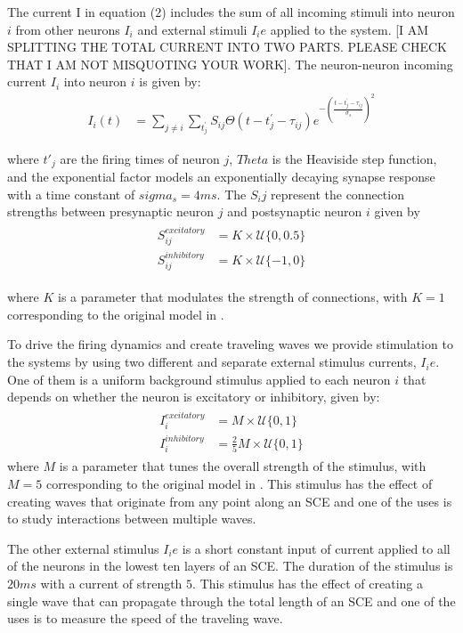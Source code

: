 \documentclass[a4paper,11pt]{article}
\begin{document}
The current I in equation (2) includes the sum of all incoming stimuli into neuron $i$ from other neurons $I_i$ and external stimuli $I_ie$ applied to the system.
[I AM SPLITTING THE TOTAL CURRENT INTO TWO PARTS. PLEASE CHECK THAT I AM NOT MISQUOTING YOUR WORK]. 
The neuron-neuron incoming current $I_i$ into neuron $i$ is given by:
\begin{align}
 I_i(t) &= \sum_{j\ne i} \sum_{t^\prime_j} S_{ij}  \Theta(t-t^\prime_j-\tau_{ij})e^{-(\frac{t-t^\prime_j-\tau_{ij}}{\sigma_s})^2}
\end{align}

where $t'_j$ are the firing times of neuron $j$, $Theta$ is the Heaviside step function, and the exponential factor models an exponentially decaying synapse response with a time constant of $sigma_s = 4 ms$. 
The $S_ij$ represent the connection strengths between presynaptic neuron $j$ and postsynaptic neuron $i$ given by
\begin{align}
 \begin{split}
  S_{ij}^{excitatory} &= K \times \mathcal{U}\{0,0.5 \} \\
  S_{ij}^{inhibitory} &= K \times \mathcal{U}\{-1,0 \} 
 \end{split}
\end{align}

where $K$ is a parameter that modulates the strength of connections, with $K=1$ corresponding to the original model in \cite{izhikevich2003}.

To drive the firing dynamics and create traveling waves we provide stimulation to the systems by using two different and separate external stimulus currents, $I_ie$. 
One of them is a uniform background stimulus applied to each neuron $i$ that depends on whether the neuron is excitatory or inhibitory, given by:
\begin{align}\label{eq:randomstim}
 \begin{split}
  I_i^{excitatory} &= M \times \mathcal{U}\{0,1 \} \\
  I_i^{inhibitory} &= \frac{2}{5} M \times \mathcal{U}\{0,1 \}
 \end{split}
\end{align}
where $M$ is a parameter that tunes the overall strength of the stimulus, with $M=5$ corresponding to the original model in \cite{izhikevich2003}. 
This stimulus has the effect of creating waves that originate from any point along an SCE and one of the uses is to study interactions between multiple waves.

The other external stimulus $I_ie$ is a short constant input of current applied to all of the neurons in the lowest ten layers of an SCE. 
The duration of the stimulus is $20 ms$ with a current of strength $5$. 
This stimulus has the effect of creating a single wave that can propagate through the total length of an SCE and one of the uses is to measure the speed of the traveling wave.
\end{document}
